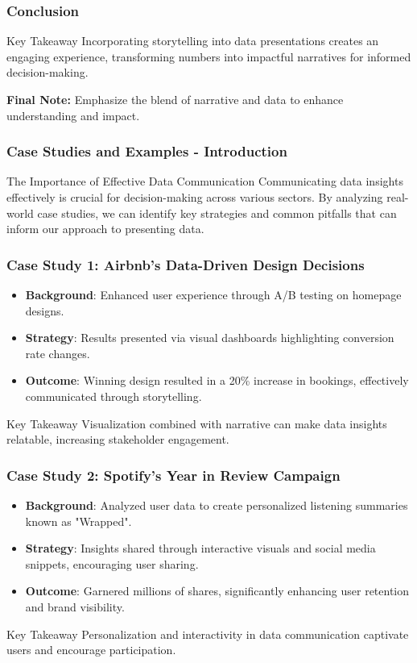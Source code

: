 \documentclass{beamer}
\begin{document}
\begin{frame}[fragile]
    \frametitle{Conclusion}
    \begin{block}{Key Takeaway}
        Incorporating storytelling into data presentations creates an engaging experience, transforming numbers into impactful narratives for informed decision-making.
    \end{block}
    \textbf{Final Note:} Emphasize the blend of narrative and data to enhance understanding and impact.
\end{frame}

\begin{frame}[fragile]
    \frametitle{Case Studies and Examples - Introduction}
    \begin{block}{The Importance of Effective Data Communication}
        Communicating data insights effectively is crucial for decision-making across various sectors. 
        By analyzing real-world case studies, we can identify key strategies and common pitfalls that can inform our approach to presenting data.
    \end{block}
\end{frame}

\begin{frame}[fragile]
    \frametitle{Case Study 1: Airbnb’s Data-Driven Design Decisions}
    \begin{itemize}
        \item \textbf{Background}: Enhanced user experience through A/B testing on homepage designs.
        \item \textbf{Strategy}: Results presented via visual dashboards highlighting conversion rate changes.
        \item \textbf{Outcome}: Winning design resulted in a 20\% increase in bookings, effectively communicated through storytelling.
    \end{itemize}
    \begin{block}{Key Takeaway}
        Visualization combined with narrative can make data insights relatable, increasing stakeholder engagement.
    \end{block}
\end{frame}

\begin{frame}[fragile]
    \frametitle{Case Study 2: Spotify’s Year in Review Campaign}
    \begin{itemize}
        \item \textbf{Background}: Analyzed user data to create personalized listening summaries known as "Wrapped".
        \item \textbf{Strategy}: Insights shared through interactive visuals and social media snippets, encouraging user sharing.
        \item \textbf{Outcome}: Garnered millions of shares, significantly enhancing user retention and brand visibility.
    \end{itemize}
    \begin{block}{Key Takeaway}
        Personalization and interactivity in data communication captivate users and encourage participation.
    \end{block}
\end{frame}
\end{document}
